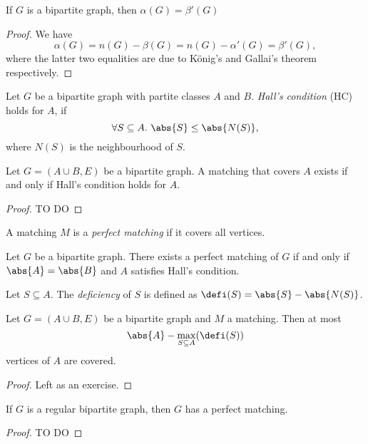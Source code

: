 \begin{corollary}
    If $G$ is a bipartite graph, then $\alpha(G) = \beta'(G)$
\end{corollary}

\begin{proof}
    We have
    \[
        \alpha(G) = n(G) - \beta(G) = n(G) - \alpha'(G) = \beta'(G),
    \]
    where the latter two equalities are due to König's and Gallai's 
    theorem respectively.
\end{proof}

\begin{definition}
    Let $G$ be a bipartite graph with partite classes $A$ and $B$. 
    \emph{Hall's condition} (HC) holds for $A$,
    if 
    \[
        \forall S \subseteq A.~\abs{S} \le \abs{N(S)},
    \]
    where $N(S)$ is the neighbourhood of $S$.
\end{definition}

\begin{theorem}[Hall]
    Let $G = (A \cup B, E)$ be a bipartite graph. A matching that covers $A$ 
    exists if and only if Hall's condition holds for $A$.
\end{theorem}

\begin{proof}
    TO DO
\end{proof}

\begin{definition}
    A matching $M$ is a \emph{perfect matching} if 
    it covers all vertices.
\end{definition}

\begin{corollary}
    Let $G$ be a bipartite graph. There exists a perfect matching of $G$ 
    if and only if $\abs{A} = \abs{B}$ and $A$ satisfies Hall's condition.
\end{corollary}

\begin{definition}
    Let $S \subseteq A$. The \emph{deficiency} of $S$ is 
    defined as $\defi(S) = \abs{S} - \abs{N(S)}$.
\end{definition}

\begin{theorem}
    Let $G = (A \cup B, E)$ be a bipartite graph and $M$ a matching. Then at 
    most
    \[
        \abs{A} - \max_{S \subseteq A}(\defi(S))
    \]
    vertices of $A$ are covered.
\end{theorem}

\begin{proof}
    Left as an exercise.
\end{proof}

\begin{theorem}
    If $G$ is a regular bipartite graph, then $G$ has a perfect matching.
\end{theorem}

\begin{proof}
    TO DO
\end{proof}